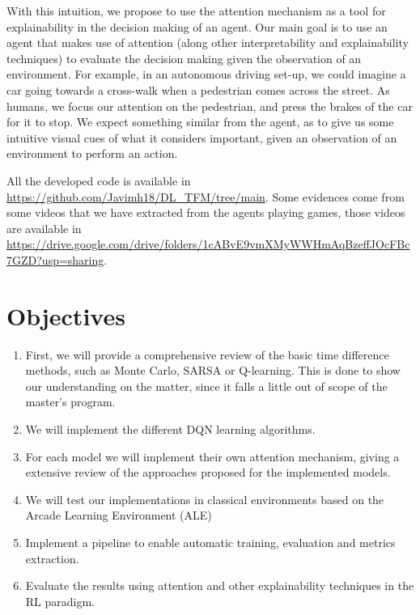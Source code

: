  With this intuition, we propose to use the attention mechanism as a tool for explainability in the decision making of an agent. Our main goal is to use an agent that makes use of attention (along other interpretability and explainability techniques) to evaluate the decision making given the observation of an environment. For example, in an autonomous driving set-up, we could imagine a car going towards a cross-walk when a pedestrian comes across the street. As humans, we focus our attention on the pedestrian, and press the brakes of the car for it to stop. We expect something similar from the agent, as to give us some intuitive visual cues of what it considers important, given an observation of an environment to perform an action.
 
 All the developed code is available in \url{https://github.com/Javimh18/DL_TFM/tree/main}. Some evidences come from some videos that we have extracted from the agents playing games, those videos are available in \url{https://drive.google.com/drive/folders/1cABvE9vmXMyWWHmAqBzeffJOcFBc7GZD?usp=sharing}.


\section{Objectives}
\label{sec:objectives}
\begin{enumerate}
	\item First, we will provide a comprehensive review of the basic time difference methods, such as Monte Carlo, SARSA or Q-learning. This is done to show our understanding on the matter, since it falls a little out of scope of the master's program.
	\item We will implement the different DQN learning algorithms. 
	\item For each model we will implement their own attention mechanism, giving a extensive review of the approaches proposed for the implemented models.
	\item We will test our implementations in classical environments based on the Arcade Learning Environment (ALE)
	\item Implement a pipeline to enable automatic training, evaluation and metrics extraction.
	\item Evaluate the results using attention and other explainability techniques in the RL paradigm.
\end{enumerate}

